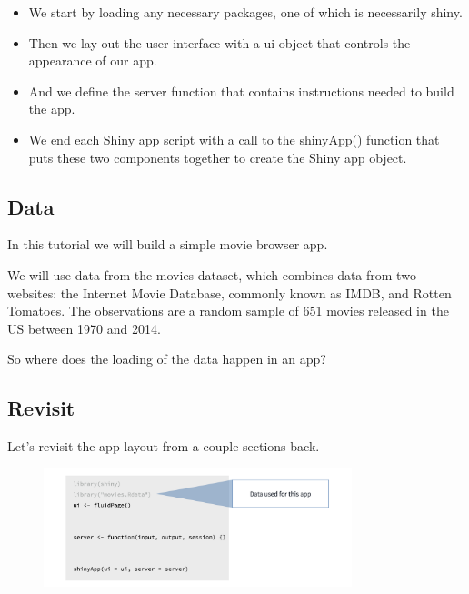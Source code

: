 \documentclass[
  letterpaper,
  DIV=11,
  numbers=noendperiod]{scrreprt}
\begin{document}
\begin{itemize}
\item
  We start by loading any necessary packages, one of which is
  necessarily shiny.
\item
  Then we lay out the user interface with a ui object that controls the
  appearance of our app.
\item
  And we define the server function that contains instructions needed to
  build the app.
\item
  We end each Shiny app script with a call to the shinyApp() function
  that puts these two components together to create the Shiny app
  object.
\end{itemize}

\hypertarget{data}{%
\subsection{Data}\label{data}}

In this tutorial we will build a simple movie browser app.

We will use data from the movies dataset, which combines data from two
websites: the Internet Movie Database, commonly known as IMDB, and
Rotten Tomatoes. The observations are a random sample of 651 movies
released in the US between 1970 and 2014.

So where does the loading of the data happen in an app?

\hypertarget{revisit}{%
\subsection{Revisit}\label{revisit}}

Let's revisit the app layout from a couple sections back.

\begin{figure}

{\centering \includegraphics[width=0.8\textwidth,height=\textheight]{./images/revisit.png}

}

\end{figure}
\end{document}
